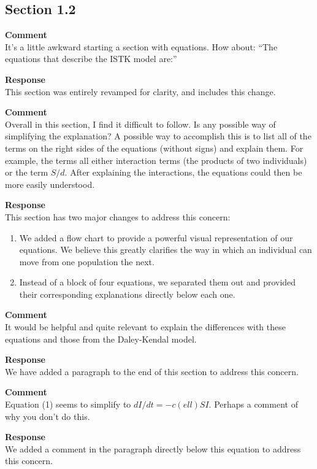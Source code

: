 \subsection{Section 1.2}
\setcounter{rev2-1.3}{1}

\textbf{Comment } \\
It’s a little awkward starting a section with equations. How about: ``The equations that describe the ISTK model are:''

\textbf{Response } \\
This section was entirely revamped for clarity, and includes this change.

\textbf{Comment } \\
Overall in this section, I find it difficult to follow.
Is any possible way of simplifying the explanation?
A possible way to accomplish this is to list all of the terms on the right sides of the equations (without signs) and explain them.
For example, the terms all either interaction terms (the products of two individuals) or the term $ S/d $.
After explaining the interactions, the equations could then be more easily understood.

\textbf{Response } \\
This section has two major changes to address this concern:
\begin{enumerate}
    \item We added a flow chart to provide a powerful visual representation of our equations.
    We believe this greatly clarifies the way in which an individual can move from one population the next.
    \item Instead of a block of four equations, we separated them out and provided their corresponding explanations directly below each one.
\end{enumerate}

\textbf{Comment } \\
It would be helpful and quite relevant to explain the differences with these equations and those from the Daley-Kendal model.

\textbf{Response } \\
We have added a paragraph to the end of this section to address this concern.

\textbf{Comment } \\
Equation (1) seems to simplify to $ dI/dt = -c(ell) S I $.
Perhaps a comment of why you don't do this.

\textbf{Response } \\
We added a comment in the paragraph directly below this equation to address this concern.
